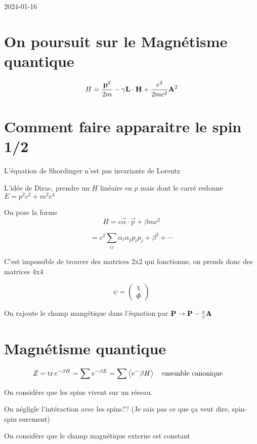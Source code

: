


2024-01-16

\section*{On poursuit sur le Magnétisme quantique }

\[ H = \frac{\vb{p}^2}{2m} - \gamma \vb{L} \cdot \vb{H} + \frac{e^{2}}{2mc^2} \vb{A}^2 \]


\section*{Comment faire apparaitre le spin 1/2}

L'équation de Shordinger n'est pas invariante de Lorentz


L'idée de Dirac, prendre un $H$ linéaire en $p$ mais dont le carré redonne $E = p^{2}c^{2}+ m^{2}c^4$


On pose la forme
\[ H = c \vec{\alpha} \cdot \vec{p} + \beta m c^{2} \]

\[ = c^{2}\sum_{ij} \alpha_i \alpha_j p_i p_j +\beta^{2} + \dotsb \]


C'est impossible de trouver des matrices 2x2 qui fonctionne, on prends donc des matrices 4x4


\[ \psi = \begin{pmatrix} \chi \\ \Phi \end{pmatrix}  \]

On rajoute le champ mangétique dans l'équation par $\vb{P} \to \vb{P} - \frac{e}{c} \vb{A}$


\section*{Magnétisme quantique}

\[ Z = \tr e^{-\beta H} = \sum e^{-\beta E}  =  \sum \expval{e^-{\beta H}} \qq{ensemble canonique} \]

On considère que les spins vivent sur un réseau.

On négligle l'intéraction avec les spins?? (Je sais pas ce que ça veut dire, spin-spin surement)

On considère que le champ magnétique externe est constant










